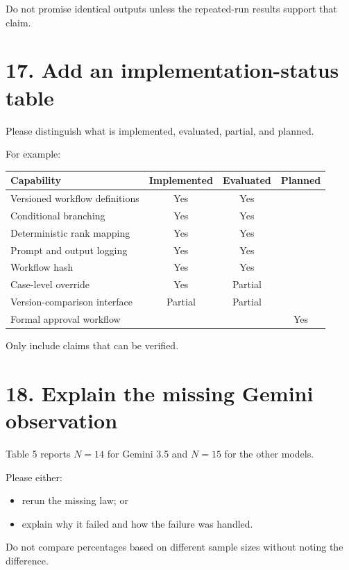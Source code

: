 \documentclass[11pt]{article}
\begin{document}
Do not promise identical outputs unless the repeated-run results support that claim.

\section*{17. Add an implementation-status table}

Please distinguish what is implemented, evaluated, partial, and planned.

For example:

\begin{center}
\small
\begin{tabularx}{\textwidth}{@{}Xccc@{}}
\toprule
\textbf{Capability} & \textbf{Implemented} & \textbf{Evaluated} & \textbf{Planned} \\
\midrule
Versioned workflow definitions & Yes & Yes & \\
Conditional branching & Yes & Yes & \\
Deterministic rank mapping & Yes & Yes & \\
Prompt and output logging & Yes & Yes & \\
Workflow hash & Yes & Yes & \\
Case-level override & Yes & Partial & \\
Version-comparison interface & Partial & Partial & \\
Formal approval workflow & & & Yes \\
\bottomrule
\end{tabularx}
\end{center}

Only include claims that can be verified.

\section*{18. Explain the missing Gemini observation}

Table 5 reports \(N=14\) for Gemini 3.5 and \(N=15\) for the other models.

Please either:

\begin{itemize}
    \item rerun the missing law; or
    \item explain why it failed and how the failure was handled.
\end{itemize}

Do not compare percentages based on different sample sizes without noting the difference.
\end{document}
